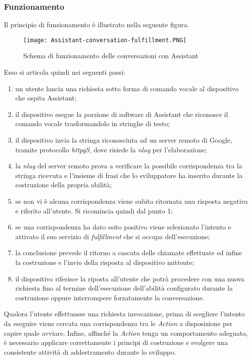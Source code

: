 		\subsubsection{Funzionamento}
		Il principio di funzionamento è illustrato nella seguente figura.
		\pagebreak
				
		\begin{figure}[htbp]
			\begin{center}
				\texttt{[image: Assistant-conversation-fulfillment.PNG]}
				\caption{Schema di funzionamento delle conversazioni con Assistant}
			\end{center}
		\end{figure}
		
		Esso si articola quindi nei seguenti passi:
		\begin{enumerate}
			\item un utente lancia una richiesta sotto forma di comando vocale al dispositivo che ospita Assistant;
			\item il dispositivo esegue la porzione di software di Assistant che riconosce il comando vocale trasformandolo in stringhe di testo;
			\item il dispositivo invia la stringa riconosciuta ad un server remoto di Google, tramite protocollo \emph{\gls{httpg}S}\glsfirstoccur, dove risiede la \emph{\gls{nlug}} per l'elaborazione;
			\item la \emph{\gls{nlug}} del server remoto prova a verificare la possibile corrispondenza tra la stringa ricevuta e l'insieme di frasi che lo sviluppatore ha inserito durante la costruzione della propria abilità;
			\item se non vi è alcuna corrispondenza viene subito ritornata una risposta negativa e riferito all'utente. Si ricomincia quindi dal punto 1;
			\item se una corrispondenza ha dato esito positivo viene selezionato l'intento e attivato il suo servizio di \emph{fulfillment} che si occupa dell'esecuzione;
			\item la conclusione prevede il ritorno a cascata delle chiamate effettuate ed infine la costruzione e l'invio della risposta al dispositivo mittente;
			\item il dispositivo riferisce la riposta all'utente che potrà procedere con una nuova richiesta fino al termine dell'esecuzione dell'abilità configurato durante la costruzione oppure interrompere forzatamente la conversazione.
		\end{enumerate}
		Qualora l'utente effettuasse una richiesta invocazione, prima di scegliere l'intento da eseguire viene cercata una corrispondenza tra le \emph{Action} a disposizione per capire quale avviare.
		Infine, affinché la \emph{Action} tenga un comportamento adeguato, è necessario applicare correttamente i principi di costruzione e svolgere una consistente attività di addestramento durante lo sviluppo.
